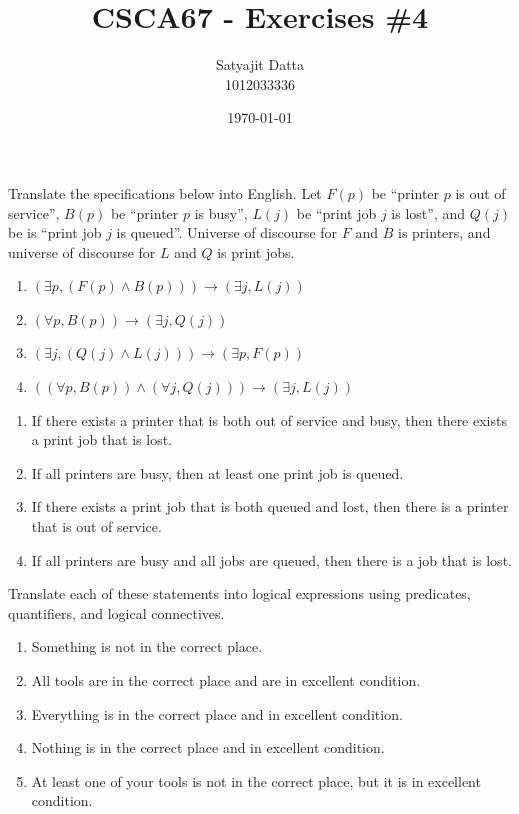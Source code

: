 \documentclass[]{article}
\title{\textbf{CSCA67 - Exercises \#4}}
\author{Satyajit Datta \\ 1012033336}
\date{\today}
\begin{document}
\maketitle

\begin{question}{2}
Translate the specifications below into English. Let $F(p)$ be “printer $p$ is out of service”, $B(p)$
be “printer $p$ is busy”, $L(j)$ be “print job $j$ is lost”, and $Q(j)$ be is “print job $j$ is queued”.
Universe of discourse for $F$ and $B$ is printers, and universe of discourse for $L$ and $Q$ is print
jobs.

\begin{enumerate}[label=\textbf{\arabic*.}]
    \item $(\exists p, (F(p) \land B(p))) \rightarrow (\exists j, L(j))$
    \item $(\forall p, B(p)) \rightarrow (\exists j, Q(j))$
    \item $(\exists j, (Q(j) \land L(j))) \rightarrow (\exists p, F(p))$
    \item $((\forall p, B(p)) \land (\forall j, Q(j))) \rightarrow (\exists j, L(j))$
\end{enumerate}
\end{question}

\begin{enumerate}[label=\textbf{\arabic*.}]
    \item If there exists a printer that is both out of service and busy, then there exists a print job that is lost.
    \item If all printers are busy, then at least one print job is queued.
    \item If there exists a print job that is both queued and lost, then there is a printer that is out of service.
    \item If all printers are busy and all jobs are queued, then there is a job that is lost.
\end{enumerate}

\begin{question}{3}
   Translate each of these statements into logical expressions using predicates, quantifiers, and
logical connectives. 

\begin{enumerate}[label=\textbf{\arabic*.}]
    \item Something is not in the correct place.
    \item All tools are in the correct place and are in excellent condition.
    \item Everything is in the correct place and in excellent condition.
    \item Nothing is in the correct place and in excellent condition.
    \item At least one of your tools is not in the correct place, but it is in excellent condition.
\end{enumerate}
\end{question}
\end{document}
